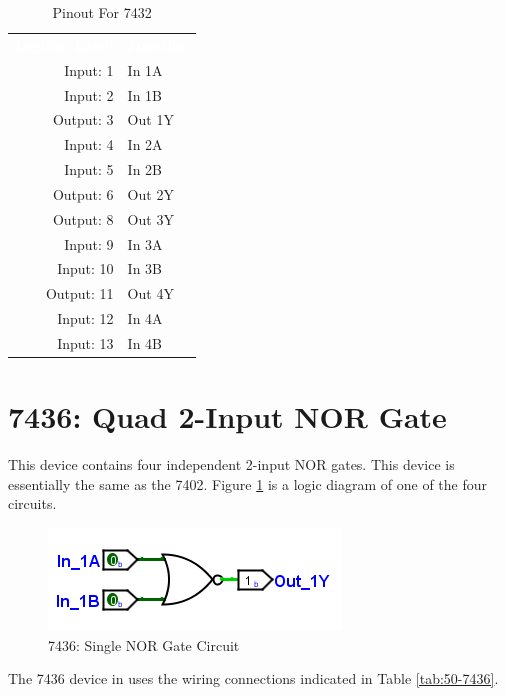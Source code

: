 \begin{table}[H]
	\sffamily
	\newcommand{\head}[1]{\textcolor{white}{\textbf{#1}}}		
	\begin{center}
		\begin{tabular}{rl} 
			\rowcolor{black!75}
			\head{Logisim Label} & \head{Function} \\
			Input: 1   & In 1A  \\
			Input: 2   & In 1B  \\
			Output: 3  & Out 1Y \\
			Input: 4   & In 2A  \\
			Input: 5   & In 2B  \\
			Output: 6  & Out 2Y \\
			Output: 8  & Out 3Y \\
			Input: 9   & In 3A  \\
			Input: 10  & In 3B  \\
			Output: 11 & Out 4Y \\
			Input: 12  & In 4A  \\
			Input: 13  & In 4B  \\
		\end{tabular}
	\end{center}
	\caption{Pinout For 7432}
	\label{tab:50-7432}
\end{table}

\section{7436: Quad 2-Input NOR Gate}

This device contains four independent 2-input NOR gates. This device is essentially the same as the 7402. Figure \ref{fig:app_ttl-7436} is a logic diagram of one of the four circuits.

\begin{figure}[H]
	\centering
	\includegraphics{gfx/app_ttl-7402}
	\caption{7436: Single NOR Gate Circuit}
	\label{fig:app_ttl-7436}
\end{figure}

The 7436 device in \LE uses the wiring connections indicated in Table \ref{tab:50-7436}.

